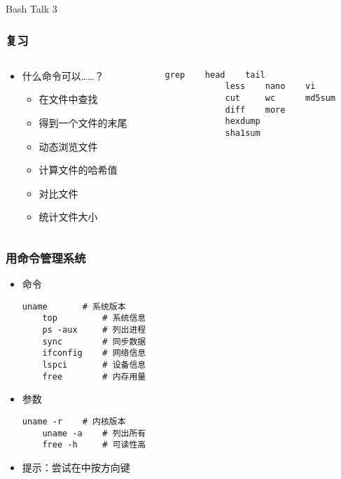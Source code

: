 



\PreFirstFrame
\begin{frame} [fragile]
	\centerline{\fontsize{42}{42}\selectfont Bash Talk 3}
\end{frame}
\PostFirstFrame

\begin{frame} [fragile]
	\frametitle{复习}
	\linespread{1.5}
	\begin{columns}[T]
		\begin{column}[T]{.5\textwidth}
			\begin{itemize}
			\item 什么命令可以……？
				\begin{itemize}
				\item 在文件中查找
				\item 得到一个文件的末尾
				\item 动态浏览文件
				\item 计算文件的哈希值
				\item 对比文件
				\item 统计文件大小
				\end{itemize}
			\end{itemize}
		\end{column}
		\begin{column}[T]{.5\textwidth}
			\begin{lstlisting}[style=bashstyle, gobble=12, texcl]
			grep	head	tail
			less	nano	vi
			cut		wc		md5sum
			diff	more
			hexdump
			sha1sum
			\end{lstlisting}
		\end{column}
	\end{columns}
\end{frame}

\begin{frame} [fragile]
	\frametitle{用命令管理系统}
	\begin{itemize}
	\item 命令
	\begin{lstlisting}[style=bashstyle, gobble=4, texcl]
	uname		# 系统版本
	top			# 系统信息
	ps -aux		# 列出进程
	sync		# 同步数据
	ifconfig	# 网络信息
	lspci		# 设备信息
	free		# 内存用量
	\end{lstlisting}
	\item 参数
	\begin{lstlisting}[style=bashstyle, gobble=4, texcl]
	uname -r	# 内核版本
	uname -a	# 列出所有
	free -h		# 可读性高
	\end{lstlisting}
	\item 提示：尝试在中按方向键
	\end{itemize}
\end{frame}

